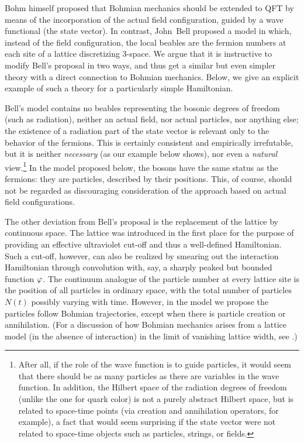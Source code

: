 \documentclass[12pt]{article}
\begin{document}
Bohm himself proposed \cite[p.~230]{BH} that Bohmian mechanics should be
extended to QFT by means of the incorporation of the actual field
configuration, guided by a wave functional (the state vector). In contrast,
John~Bell proposed a model \cite[p.~173]{BellBible} in which, instead of
the field configuration, the local beables are the fermion numbers at each
site of a lattice discretizing 3-space.  We argue that it is instructive to
modify Bell's proposal in two ways, and thus get a similar but even
simpler theory with a direct connection to Bohmian mechanics. Below, we
give an explicit example of such a theory for a particularly simple
Hamiltonian.

Bell's model contains no beables representing the bosonic degrees of
freedom (such as radiation), neither an actual field, nor actual particles,
nor anything else; the existence of a radiation part of the state vector
is relevant  only to the behavior of the fermions. This is certainly
consistent and empirically irrefutable, but it is neither
\emph{necessary} (as our example below shows), nor even a
\emph{natural} view.\footnote{
%
After all, if the role of the wave function is to guide particles, it would
seem that there should be as many particles as there are variables in the
wave function. In addition, the Hilbert space of the radiation degrees of
freedom (unlike the one for quark color) is not a purely abstract Hilbert
space, but is related to space-time points (via creation and annihilation
operators, for example), a fact that would seem surprising if the state
vector were not related to space-time objects such as particles, strings,
or fields.
%
} In the model proposed below, the bosons have the same status as the
fermions: they are particles, described by their positions.  This, of
course, should not be regarded as discouraging consideration of the
approach based on actual field configurations.

The other deviation from Bell's proposal is the replacement of the lattice
by continuous space.  The lattice was introduced in the first place for the
purpose of providing an effective ultraviolet cut-off and thus a
well-defined Hamiltonian. Such a cut-off, however, can also be realized by
smearing out the interaction Hamiltonian through convolution with, say, a
sharply peaked but bounded function $\varphi$. The continuum analogue of the particle
number at every lattice site is the position of all particles in ordinary
space, with the total number of particles $N(t)$ possibly varying with
time. However, in the model we propose the particles follow Bohmian
trajectories, except when there is particle creation or annihilation. (For a
discussion of how Bohmian mechanics arises from a lattice model (in the
absence of interaction) in the limit of vanishing lattice width, see
\cite{Sudbery,Vink}.)
\end{document}
